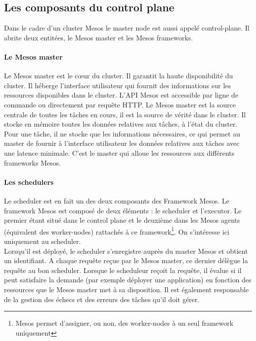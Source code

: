 \documentclass[11pt,fleqn]{book} %
\begin{document}
\subsection*{Les composants du control plane}
Dans le cadre d'un cluster Mesos le master node est aussi appelé control-plane. Il abrite deux entitées, le Mesos master et les Mesos frameworks.
\paragraph*{Le Mesos master}
Le Mesos master est le cœur du cluster. Il garantit la haute disponibilité du cluster. Il héberge l'interface utilisateur qui fournit des informations sur les ressources disponibles dans le cluster. L'API Mesos est accessible par ligne de commande ou directement par requête HTTP. Le Mesos master est la source centrale de toutes les tâches en cours, il est la source de vérité dans le cluster. Il stocke en mémoire toutes les données relatives aux tâches, à l'état du cluster. Pour une tâche, il ne stocke que les informations nécessaires, ce qui permet au master de fournir à l'interface utilisateur les données relatives aux tâches avec une latence minimale. C'est le master qui alloue les ressources aux différents frameworks Mesos.

\paragraph*{Les schedulers}
Le scheduler est en fait un des deux composants des Framework Mesos. Le framework Mesos est composé de deux éléments : le scheduler et l'executor. Le premier étant situé dans le control plane et le deuxième dans les Mesos agents (équivalent des worker-nodes) rattachés à ce framework\footnote{Mesos permet d'assigner, ou non, des worker-nodes à un seul framework uniquement}. On s'intéresse ici uniquement au scheduler. \\

Lorsqu'il est déployé, le scheduler s'enregistre auprès du master Mesos et obtient un identifiant. A chaque requête reçue par le Mesos master, ce dernier délègue la requête au bon scheduler. Lorsque le scheduleur reçoit la requête, il évalue si il peut satisfaire la demande (par exemple déployer une application) en fonction des ressources que le Mesos master met à sa disposition. Il est également responsable de la gestion des échecs et des erreurs des tâches qu'il doit gérer. \\
\end{document}
